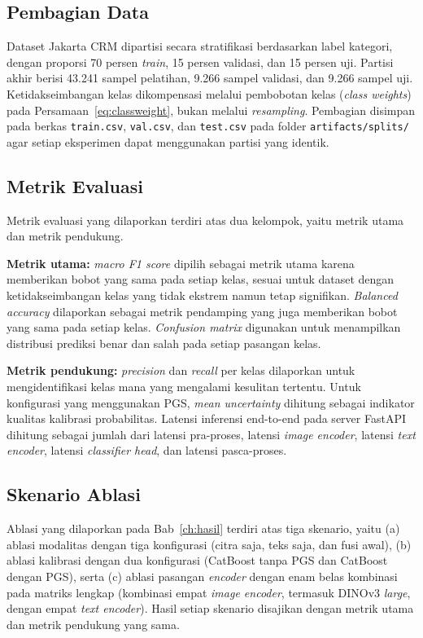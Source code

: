 \subsection{Pembagian Data}

Dataset Jakarta CRM dipartisi secara stratifikasi berdasarkan label kategori, dengan proporsi 70 persen \textit{train}, 15 persen validasi, dan 15 persen uji. Partisi akhir berisi 43.241 sampel pelatihan, 9.266 sampel validasi, dan 9.266 sampel uji. Ketidakseimbangan kelas dikompensasi melalui pembobotan kelas (\textit{class weights}) pada Persamaan~\ref{eq:classweight}, bukan melalui \textit{resampling}. Pembagian disimpan pada berkas \texttt{train.csv}, \texttt{val.csv}, dan \texttt{test.csv} pada folder \texttt{artifacts/splits/} agar setiap eksperimen dapat menggunakan partisi yang identik.

\subsection{Metrik Evaluasi}

Metrik evaluasi yang dilaporkan terdiri atas dua kelompok, yaitu metrik utama dan metrik pendukung.

\textbf{Metrik utama:} \textit{macro F1 score} dipilih sebagai metrik utama karena memberikan bobot yang sama pada setiap kelas, sesuai untuk dataset dengan ketidakseimbangan kelas yang tidak ekstrem namun tetap signifikan. \textit{Balanced accuracy} dilaporkan sebagai metrik pendamping yang juga memberikan bobot yang sama pada setiap kelas. \textit{Confusion matrix} digunakan untuk menampilkan distribusi prediksi benar dan salah pada setiap pasangan kelas.

\textbf{Metrik pendukung:} \textit{precision} dan \textit{recall} per kelas dilaporkan untuk mengidentifikasi kelas mana yang mengalami kesulitan tertentu. Untuk konfigurasi yang menggunakan PGS, \textit{mean uncertainty} dihitung sebagai indikator kualitas kalibrasi probabilitas. Latensi inferensi end-to-end pada server FastAPI dihitung sebagai jumlah dari latensi pra-proses, latensi \textit{image encoder}, latensi \textit{text encoder}, latensi \textit{classifier head}, dan latensi pasca-proses.

\subsection{Skenario Ablasi}

Ablasi yang dilaporkan pada Bab~\ref{ch:hasil} terdiri atas tiga skenario, yaitu (a) ablasi modalitas dengan tiga konfigurasi (citra saja, teks saja, dan fusi awal), (b) ablasi kalibrasi dengan dua konfigurasi (CatBoost tanpa PGS dan CatBoost dengan PGS), serta (c) ablasi pasangan \textit{encoder} dengan enam belas kombinasi pada matriks lengkap (kombinasi empat \textit{image encoder}, termasuk DINOv3 \textit{large}, dengan empat \textit{text encoder}). Hasil setiap skenario disajikan dengan metrik utama dan metrik pendukung yang sama.

